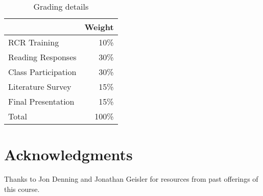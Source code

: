 \documentclass[11pt]{article}
\begin{document}
\begin{table}[htb]
  \centering
  \begin{tabular}{lr}
    \toprule
                        & Weight \\
    \midrule
    RCR Training        & 10\%   \\
    Reading Responses   & 30\%   \\
    Class Participation & 30\%   \\
    Literature Survey   & 15\%   \\
    Final Presentation  & 15\%   \\
    \midrule
    Total               & 100\%  \\
    \bottomrule
  \end{tabular}
  \caption{Grading details}
  \label{tab:grading}
\end{table}



\section{Acknowledgments}

Thanks to Jon Denning and Jonathan Geisler
for resources from past offerings of this course.

\lastupdated
\end{document}
